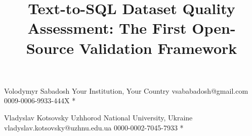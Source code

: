 \documentclass[]{einformatica}
\begin{document}
\nocite{furst2024datamodel,shi2025survey,gao2023text2sql,spiderLeaderboard,shkapenyuk2025metadata,birdLeaderboard,yu2018spider,snowflakeCopilotInline,databricksGenie,fabricCopilotSql,chang2023drspider,yao2025arctic,zhong2017seq2sql,li2023bird,gretelSynthDataset,li2025omnisql,liu2025nl2sqlbugs,mitsopoulou2025analysis,pandey2024validation,pythonDocs311,duckdbDocs,sqlalchemyDocs20,sqlglotRepo,dependencyInjectorDocs,pyyaml,karwin2010sqlantipatterns,date2012sqlrelational,iso9075_2_2016,sqliteBareColumns,postgresGroupBy,mysqlGroupByHandling,molinaro2020sqlcookbook,ramakrishnan2003dbms,sqliteForeignKeys,openaiModelsDocs,geminiApiDocs}

\title{Text-to-SQL Dataset Quality Assessment: The First Open-Source Validation Framework}



\EIauthorI
   {Volodymyr}
   {Sabadosh}
   {Your Institution, Your Country}
   {vsababadosh@gmail.com}
   {0009-0006-9933-444X}
   {*} %

\EIauthorII
   {Vladyslav}
   {Kotsovsky}
   {Uzhhorod National University, Ukraine}
   {vladyslav.kotsovsky@uzhnu.edu.ua}
   {0000-0002-7045-7933}
   {*} %
 
\end{document}
